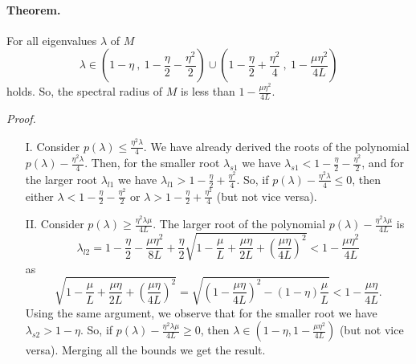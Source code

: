 \documentclass[11pt]{article}
\begin{document}
\bigskip

\paragraph{Theorem.} For all eigenvalues $\lambda$ of $M$
\[
 \lambda\in\left(1-\eta \ , \ 1-\frac{\eta}{2}-\frac{\eta^2}{2}\right)\cup\left(1-\frac{\eta}{2}+\frac{\eta^2}{4} \ , \ 1-\frac{\mu\eta^2}{4L}\right)
\]
holds.  So, the spectral radius of $M$ is less than $1-\displaystyle\frac{\mu\eta^2}{4L}$.


\bigskip

\noindent
\textit{Proof.} 
\begin{itemize}
 \item[I.] Consider $p(\lambda)\leq \displaystyle\frac{\eta^2 \lambda}{4}$. We have already derived the roots of the polynomial $p(\lambda)-\displaystyle\frac{\eta^2 \lambda}{4}$. Then, 
 for the smaller root $\lambda_{s1}$ we have $\lambda_{s1}<1-\displaystyle\frac{\eta}{2}-\displaystyle\frac{\eta^2}{2}$, and for the larger root $\lambda_{l1}$ we have $\lambda_{l1}>1-\displaystyle\frac{\eta}{2}+\displaystyle\frac{\eta^2}{4}$.  So, if $p(\lambda)-\displaystyle\frac{\eta^2 \lambda}{4}\leq 0$, then either $\lambda < 1-\displaystyle\frac{\eta}{2}-\displaystyle\frac{\eta^2}{2}$ or $\lambda > 1-\displaystyle\frac{\eta}{2}+\displaystyle\frac{\eta^2}{4}$ (but not vice versa).
 \item[II.] Consider $p(\lambda)\geq \displaystyle\frac{\eta^2 \lambda\mu}{4L}$.  The larger root of the polynomial $p(\lambda)-\displaystyle\frac{\eta^2 \lambda\mu}{4L}$ is
 \[
  \lambda_{l2} = 1-\frac{\eta}{2}-\frac{\mu\eta^2}{8L}+\frac{\eta}{2}\sqrt{1-\frac{\mu}{L}+\frac{\mu\eta}{2L}+\left(\frac{\mu\eta}{4L}\right)^2}<1-\frac{\mu\eta^2}{4L}
 \]
as 
 \[
  \sqrt{1-\frac{\mu}{L}+\frac{\mu\eta}{2L}+\left(\frac{\mu\eta}{4L}\right)^2} = \sqrt{\left(1-\frac{\mu\eta}{4L}\right)^2-(1-\eta)\frac{\mu}{L}}<1-\frac{\mu\eta}{4L}.
 \]
Using the same argument, we observe that for the smaller root we have $\lambda_{s2}>1-\eta$.  So, if $p(\lambda)- \displaystyle\frac{\eta^2 \lambda\mu}{4L}\geq 0$, then $\lambda\in(1-\eta,1-\displaystyle\frac{\mu\eta^2}{4L})$ (but not vice versa). Merging all the bounds we get the result.

 
\end{itemize}
\end{document}
